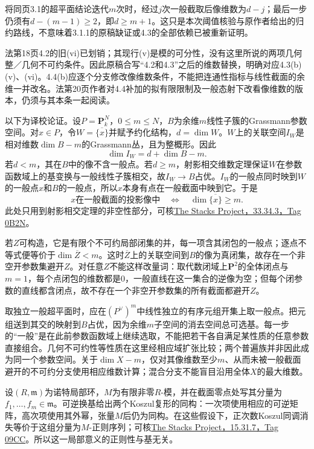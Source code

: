 将同页3.1的超平面结论迭代$m$次时，经过$j$次一般截取后像维数为$d-j$；最后一步仍须有$d-(m-1)\geq2$，即$d\geq m+1$。这只是本次阈值核验与原作者给出的归约路线，不意味着3.1.1的原稿缺证或4.3的全部依赖已被重新证明。

法第18页4.2的旧(vi)已划销；其现行(v)是模的可分性，没有这里所说的两项几何整／几何不可约条件。因此原稿合写“4.2和4.3”之后的维数替换，明确对应4.3(b)(v)、(vi)。4.4(b)应逐个分支修改像维数条件，不能把连通性指标与线性截面的余维一并改名。法第20页作者对4.4补加的拟有限限制及一般态射下改看像维数的版本，仍须与其本条一起阅读。

以下为译校论证。设$P=\mathbf P^N_k$，$0\leq m\leq N$，$B$为余维$m$线性子簇的Grassmann参数空间。对$x\in P$，令$W=\overline{\{x\}}$并赋予约化结构，$d=\dim W$。$W$上的关联空间$I_W$是相对维数$\dim B-m$的Grassmann丛，且为整概形。因此
\[
 \dim I_W=d+\dim B-m.
\]
若$d<m$，其在$B$中的像不含一般点。若$d\geq m$，射影相交维数定理保证$W$在参数函数域上的基变换与一般线性子簇相交，故$I_W\to B$占优。$I_W$的一般点同时映到$W$的一般点$x$和$B$的一般点，所以$x$本身有点在一般截面中映到它。于是
\[
 x\text{在一般截面的投影像中}
 \quad\Longleftrightarrow\quad
 \dim\overline{\{x\}}\geq m.
\]
此处只用到射影相交定理的非空性部分，可核\href{https://stacks.math.columbia.edu/tag/0B2N}{The Stacks Project，33.34.3，Tag 0B2N}。

若$Z$可构造，它是有限个不可约局部闭集的并，每一项含其闭包的一般点；逐点不等式便等价于$\dim\overline Z<m$。这时$\overline Z$上的关联空间到$B$的像为真闭集，故存在一个非空开参数集避开$Z$。对任意$Z$不能这样改量词：取代数闭域上$\mathbf P^2$的全体闭点与$m=1$，每个点闭包的维数都是0，一般直线在这一集合的逆像为空；但每个闭参数的直线都含闭点，故不存在一个非空开参数集的所有截面都避开$Z$。

取独立一般超平面时，应在$(P^\vee)^m$中线性独立的有序元组开集上取一般点。把元组送到其交的映射到$B$占优，因为余维$m$子空间的消去空间总可选基。每一步的“一般”是在此前参数函数域上继续选取，不能把若干各自满足某性质的任意参数直接组合。几何不可约性等性质在这里经相应域扩张比较；两个普遍族并非因此成为同一个参数空间。关于$\dim X-m$，仅对其像维数至少$m$、从而未被一般截面避开的不可约分支使用相应维数计算；混合分支不能盲目沿用全体$X$的最大维数。

设$(R,\mathfrak m)$为诺特局部环，$M$为有限非零$R$-模，并在截面零点处写其分量为$f_1,\ldots,f_m\in\mathfrak m$。可逆换基给出两个Koszul复形的同构：一次项使用相应的可逆矩阵，高次项使用其外幂，张量$M$后仍为同构。在这些假设下，正次数Koszul同调消失等价于这组分量为$M$-正则序列；可核\href{https://stacks.math.columbia.edu/tag/09CC}{The Stacks Project，15.31.7，Tag 09CC}。所以这一局部意义的正则性与基无关。

